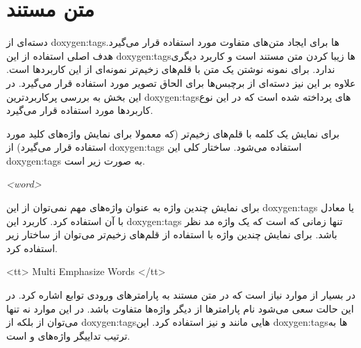 %
% 
% 
% 
%

\section{متن مستند}

دسته‌ای از \glspl{doxygen:tag}‌ها برای ایجاد متن‌های متفاوت مورد استفاده قرار می‌گیرد. هدف
اصلی استفاده از این \glspl{doxygen:tag}‌ها زیبا کردن متن مستند است و کاربرد دیگری ندارد. برای
نمونه نوشتن یک متن با قلم‌های زخیم‌تر نمونه‌ای از این کاربردها است. علاوه بر این
نیز دسته‌ای از برچبس‌ها برای الحاق تصویر مورد استفاده قرار می‌گیرد. در این بخش به بررسی
پرکاربردترین \glspl{doxygen:tag}‌های پرداخته شده است که در این نوع کاربردها مورد استفاده قرار
می‌گیرد.


برای نمایش یک کلمه با قلم‌های زخیم‌تر (که معمولا برای نمایش واژه‌های کلید مورد
استفاده قرار می‌گیرد) از \glspl{doxygen:tag}  استفاده می‌شود. ساختار کلی
این \glspl{doxygen:tag} به صورت زیر است.

\begin{doxygen}
\em <word>
\end{doxygen}

برای نمایش چندین واژه به عنوان واژه‌های مهم نمی‌توان از این \glspl{doxygen:tag}
یا معادل با آن استفاده کرد. کاربرد این \glspl{doxygen:tag} تنها زمانی که است که
یک واژه مد نظر باشد. برای نمایش چندین واژه با استفاده از قلم‌های زخیم‌تر می‌توان
از ساختار زیر استفاده کرد.

\begin{doxygen}
<tt> Multi Emphasize Words </tt>
\end{doxygen}

در بسیار از موارد نیاز است که در متن مستند به پارامترهای ورودی توابع اشاره کرد.
در این حالت سعی می‌شود نام پارامترها از دیگر واژه‌ها متفاوت باشد.
در این موارد نه تنها می‌توان از  بلکه از \glspl{doxygen:tag}هایی مانند
 و   نیز استفاده کرد. این \glspl{doxygen:tag}ها به ترتیب تداییگر
واژه‌های  و  است.

